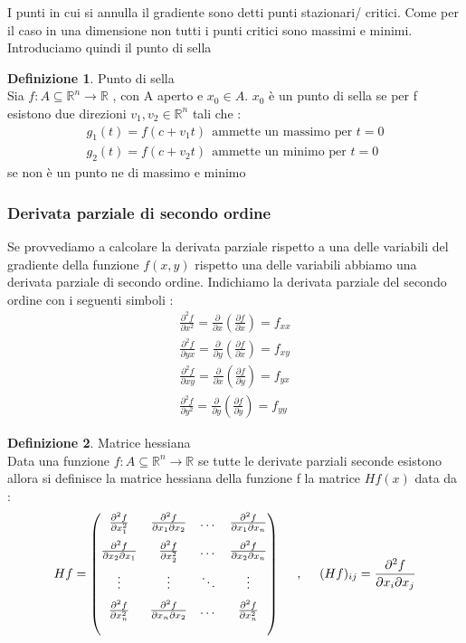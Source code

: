 \documentclass{article}
\theoremstyle{definition}
\newtheorem*{definizione}{Definizione}
\newcommand{\R}{\mathbb{R}}
\newcommand{\Rn}{\R^n}
\newcommand{\fn}{f: A\subseteq \Rn \rightarrow \R}
\begin{document}
	I punti in cui si annulla il gradiente sono detti punti stazionari/ critici. Come per il caso in una dimensione non tutti i punti critici sono massimi e minimi. Introduciamo quindi il punto di sella 
	\begin{definizione}
		Punto di sella \\
		Sia $\fn$ , con A aperto e $x_0 \in A$. $x_0$ è un punto di sella se per f esistono due direzioni $v_1,v_2 \in \Rn$ tali che : \begin{align*}
			g_1(t)=f(c+v_1t)\ \ \text{ammette un massimo per } t=0 \\
			g_2(t)=f(c+v_2t) \ \ \text{ammette un minimo per } t=0    \end{align*}
		se non è un punto ne di massimo e minimo 
	\end{definizione}
	\subsubsection{Derivata parziale di secondo ordine}
	Se provvediamo a calcolare la derivata parziale rispetto a una delle
	variabili del gradiente della funzione $f(x,y)$ rispetto una
	delle variabili abbiamo una derivata parziale di secondo ordine. 
	Indichiamo la derivata parziale del secondo ordine con i seguenti simboli :
	\begin{align*}
		\frac{\partial^2f}{\partial x^2}=\frac{\partial}{\partial x}(\frac{\partial f}{\partial x })=f_{xx}  \\
		\frac{\partial^2f}{\partial yx}=\frac{\partial}{\partial y}(\frac{\partial f}{\partial x })=f_{xy}\\
		\frac{\partial^2f}{\partial xy}=\frac{\partial}{\partial x}(\frac{\partial f}{\partial y})=f_{yx}\\
		\frac{\partial^2f}{\partial y^2}=\frac{\partial}{\partial y}(\frac{\partial f}{\partial y })=f_{yy}
	\end{align*} 
	\begin{definizione}
		Matrice hessiana \\
		Data una funzione $\fn$ se tutte le derivate parziali seconde esistono allora si definisce la matrice hessiana della funzione f la matrice $Hf(x)$ data da : 
		$$Hf=\begin{pmatrix}
			\vspace{0.2cm}
			\frac{\partial^2f}{\partial x_1^2} & \frac{\partial^2f}{\partial x_1 \partial x_2} & \dots & \frac{\partial^2f}{\partial x_1 \partial x_n} \\ \vspace{0.2cm}
			\frac{\partial^2f}{\partial x_2 \partial x_1} & \frac{\partial^2f}{\partial x_2^2 } & \dots & \frac{\partial^2f}{\partial x_2 \partial x_n} \\ \vspace{0.2cm}
			\vdots & \vdots & \ddots & \vdots \\
			\frac{\partial^2f}{\partial x_n^2} & \frac{\partial^2f}{\partial x_n \partial x_2} & \dots & \frac{\partial^2f}{\partial x_n^2} \\
			\textbf{}
		\end{pmatrix}\ \ \ \ ,\ \ \ \ (Hf)_{ij}=\frac{\partial^2f}{\partial x_i \partial x_j}$$
	\end{definizione}
	
\end{document}
